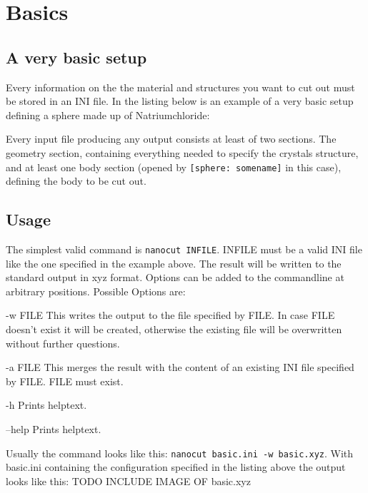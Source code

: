 \section{Basics}
\subsection{A very basic setup}

Every information on the the material and structures you want to cut out must be stored in an INI file. In the listing below is an example of a very basic setup defining a sphere made up of Natriumchloride:

Every input file producing any output consists at least of two sections. The geometry section, containing everything needed to specify the crystals structure, and at least one body section (opened by \lstinline{[sphere: somename]} in this case), defining the body to be cut out.

\subsection{Usage}

The simplest valid command is \lstinline{nanocut INFILE}. INFILE must be a valid INI file like the one specified in the example above. The result will be written to the standard output in xyz format. Options can be added to the commandline at arbitrary positions. Possible Options are:
\begin{description}
 \item{-w FILE} This writes the output to the file specified by FILE. In case FILE doesn't exist it will be created, otherwise the existing file will be overwritten without further questions.
 \item{-a FILE} This merges the result with the content of an existing INI file specified by FILE. FILE must exist.
 \item{-h} Prints helptext.
 \item{--help} Prints helptext.
\end{description}
Usually the command looks like this: \lstinline{nanocut basic.ini -w basic.xyz}. With basic.ini containing the configuration specified in the listing above the output looks like this:
TODO INCLUDE IMAGE OF basic.xyz